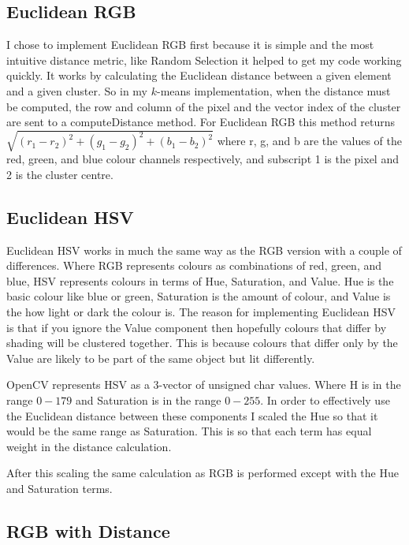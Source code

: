 \documentclass{article}
\begin{document}
\subsection{Euclidean RGB}

I chose to implement Euclidean RGB first because it is simple and the most intuitive distance metric, like Random Selection it helped to get my code working quickly. It works by calculating the Euclidean distance between a given element and a given cluster. So in my $k$-means implementation, when the distance must be computed, the row and column of the pixel and the vector index of the cluster are sent to a computeDistance method. For Euclidean RGB this method returns $\sqrt{(r_1-r_2)^2 + (g_1-g_2)^2 + (b_1-b_2)^2}$ where r, g, and b are the values of the red, green, and blue colour channels respectively, and subscript 1 is the pixel and 2 is the cluster centre. 

\subsection{Euclidean HSV}

Euclidean HSV works in much the same way as the RGB version with a couple of differences. Where RGB represents colours as combinations of red, green, and blue, HSV represents colours in terms of Hue, Saturation, and Value. Hue is the basic colour like blue or green, Saturation is the amount of colour, and Value is the how light or dark the colour is. The reason for implementing Euclidean HSV is that if you ignore the Value component then hopefully colours that differ by shading will be clustered together. This is because colours that differ only by the Value are likely to be part of the same object but lit differently.

OpenCV represents HSV as a 3-vector of unsigned char values. Where H is in the range $0-179$ and Saturation is in the range $0-255$. In order to effectively use the Euclidean distance between these components I scaled the Hue so that it would be the same range as Saturation. This is so that each term has equal weight in the distance calculation. 

After this scaling the same calculation as RGB is performed except with the Hue and Saturation terms. 

\subsection{RGB with Distance}
\end{document}
